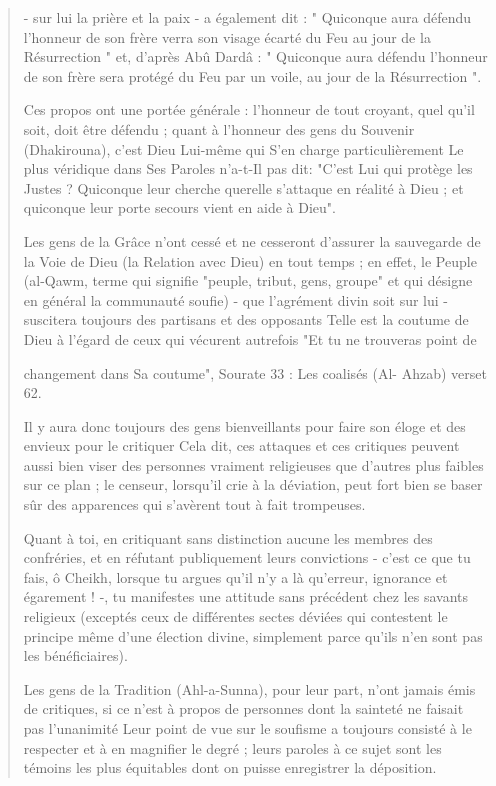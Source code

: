\begin{quote}
- sur lui la prière et la paix - a également dit : " Quiconque aura
défendu l'honneur de son frère verra son visage écarté du Feu au jour de
la Résurrection " et, d'après Abû Dardâ : " Quiconque aura défendu
l'honneur de son frère sera protégé du Feu par un voile, au jour de la
Résurrection ".

Ces propos ont une portée générale : l'honneur de tout croyant, quel
qu'il soit, doit être défendu ; quant à l'honneur des gens du Souvenir
(Dhakirouna), c'est Dieu Lui-même qui S'en charge particulièrement Le
plus véridique dans Ses Paroles n'a-t-Il pas dit: "C'est Lui qui protège
les Justes ? Quiconque leur cherche querelle s'attaque en réalité à Dieu
; et quiconque leur porte secours vient en aide à Dieu".

Les gens de la Grâce n'ont cessé et ne cesseront d'assurer la sauvegarde
de la Voie de Dieu (la Relation avec Dieu) en tout temps ; en effet, le
Peuple (al-Qawm, terme qui signifie "peuple, tribut, gens, groupe" et
qui désigne en général la communauté soufie) - que l'agrément divin soit
sur lui - suscitera toujours des partisans et des opposants Telle est la
coutume de Dieu à l'égard de ceux qui vécurent autrefois "Et tu ne
trouveras point de

changement dans Sa coutume", Sourate 33 : Les coalisés (Al- Ahzab)
verset 62.

Il y aura donc toujours des gens bienveillants pour faire son éloge et
des envieux pour le critiquer Cela dit, ces attaques et ces critiques
peuvent aussi bien viser des personnes vraiment religieuses que d'autres
plus faibles sur ce plan ; le censeur, lorsqu'il crie à la déviation,
peut fort bien se baser sûr des apparences qui s'avèrent tout à fait
trompeuses.

Quant à toi, en critiquant sans distinction aucune les membres des
confréries, et en réfutant publiquement leurs convictions - c'est ce que
tu fais, ô Cheikh, lorsque tu argues qu'il n'y a là qu'erreur, ignorance
et égarement ! -, tu manifestes une attitude sans précédent chez les
savants religieux (exceptés ceux de différentes sectes déviées qui
contestent le principe même d'une élection divine, simplement parce
qu'ils n'en sont pas les bénéficiaires).

Les gens de la Tradition (Ahl-a-Sunna), pour leur part, n'ont jamais
émis de critiques, si ce n'est à propos de personnes dont la sainteté ne
faisait pas l'unanimité Leur point de vue sur le soufisme a toujours
consisté à le respecter et à en magnifier le degré ; leurs paroles à ce
sujet sont les témoins les plus équitables dont on puisse enregistrer la
déposition.


\end{quote}
